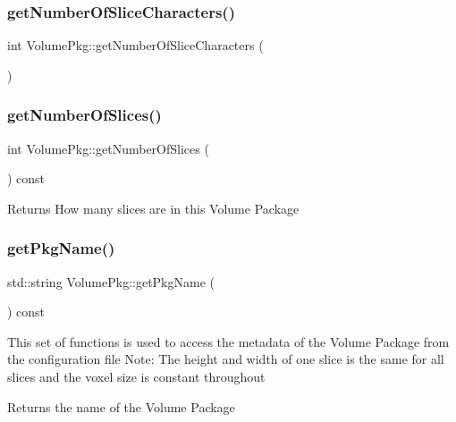 \subsubsection{\texorpdfstring{get\+Number\+Of\+Slice\+Characters()}{getNumberOfSliceCharacters()}}
{\footnotesize\ttfamily int Volume\+Pkg\+::get\+Number\+Of\+Slice\+Characters (\begin{DoxyParamCaption}{ }\end{DoxyParamCaption})\hspace{0.3cm}{\ttfamily [private]}}

\hypertarget{classVolumePkg_a918b84ee059538166553c949188a8fd9}{}\label{classVolumePkg_a918b84ee059538166553c949188a8fd9} 
\subsubsection{\texorpdfstring{get\+Number\+Of\+Slices()}{getNumberOfSlices()}}
{\footnotesize\ttfamily int Volume\+Pkg\+::get\+Number\+Of\+Slices (\begin{DoxyParamCaption}{ }\end{DoxyParamCaption}) const}

\begin{DoxyReturn}{Returns}
How many slices are in this Volume Package 
\end{DoxyReturn}
\hypertarget{classVolumePkg_a3c9253427cf985c1bd523d84c396677b}{}\label{classVolumePkg_a3c9253427cf985c1bd523d84c396677b} 
\subsubsection{\texorpdfstring{get\+Pkg\+Name()}{getPkgName()}}
{\footnotesize\ttfamily std\+::string Volume\+Pkg\+::get\+Pkg\+Name (\begin{DoxyParamCaption}{ }\end{DoxyParamCaption}) const}

This set of functions is used to access the metadata of the Volume Package from the configuration file Note\+: The height and width of one slice is the same for all slices and the voxel size is constant throughout\begin{DoxyReturn}{Returns}
the name of the Volume Package 
\end{DoxyReturn}
\hypertarget{classVolumePkg_a1fe0966da96333797dc6be5045766148}{}\label{classVolumePkg_a1fe0966da96333797dc6be5045766148} 
